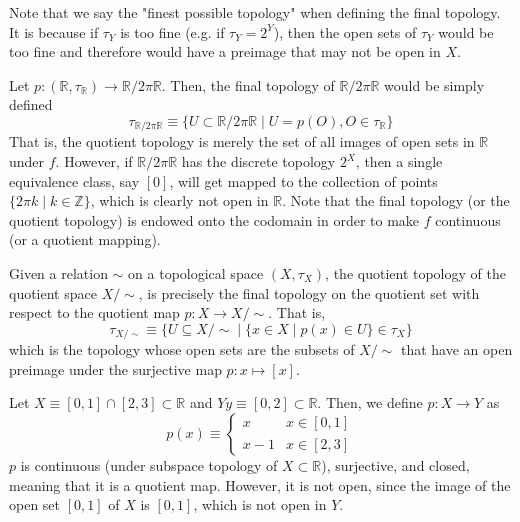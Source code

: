     Note that we say the "finest possible topology" when defining the final topology. It is because if $\tau_Y$ is too fine (e.g. if $\tau_Y = 2^Y$), then the open sets of $\tau_Y$ would be too fine and therefore would have a preimage that may not be open in $X$. 

    \begin{example}
    Let $p: (\mathbb{R}, \tau_\mathbb{R}) \longrightarrow \mathbb{R} / 2 \pi \mathbb{R}$. Then, the final topology of $\mathbb{R} / 2 \pi \mathbb{R}$ would be simply defined 
    \[\tau_{\mathbb{R} / 2 \pi \mathbb{R}} \equiv \{U \subset \mathbb{R} / 2\pi \mathbb{R} \; | \; U = p(O), O \in \tau_\mathbb{R}\}\]
    That is, the quotient topology is merely the set of all images of open sets in $\mathbb{R}$ under $f$. However, if $\mathbb{R} / 2 \pi \mathbb{R}$ has the discrete topology $2^X$, then a single equivalence class, say $[0]$, will get mapped to the collection of points $\{2 \pi k \; | \; k \in \mathbb{Z}\}$, which is clearly not open in $\mathbb{R}$. Note that the final topology (or the quotient topology) is endowed onto the codomain in order to make $f$ continuous (or a quotient mapping). 
    \end{example}

    \begin{proposition}
    Given a relation $\sim$ on a topological space $(X, \tau_X)$, the quotient topology of the quotient space $X / \sim$, is precisely the final topology on the quotient set with respect to the quotient map $p: X \longrightarrow X / \sim$. That is, 
    \[\tau_{X / \sim} \equiv \big\{U \subseteq X / \sim \; | \; \{x \in X \; | \; p(x) \in U\} \in \tau_X \big\}\]
    which is the topology whose open sets are the subsets of $X / \sim$ that have an open preimage under the surjective map $p: x \mapsto [x]$. 
    \end{proposition}

    \begin{example}
    Let $X \equiv [0,1] \cap [2,3] \subset \mathbb{R}$ and $Y y \equiv [0,2] \subset \mathbb{R}$. Then, we define $p: X \longrightarrow Y$ as 
    \[p(x) \equiv \begin{cases}
          x & x \in [0,1] \\
          x-1 & x \in [2,3]
    \end{cases}\]
    $p$ is continuous (under subspace topology of $X \subset \mathbb{R}$), surjective, and closed, meaning that it is a quotient map. However, it is not open, since the image of the open set $[0,1]$ of $X$ is $[0,1]$, which is not open in $Y$. 
    \end{example}

